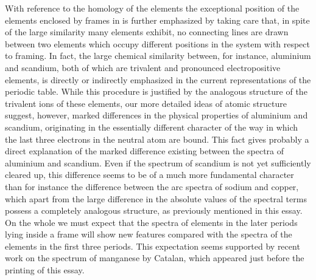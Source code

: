 With reference to the homology of the elements the exceptional
position of the elements enclosed by frames in  is further
emphasized by taking care that, in spite of the large similarity
many elements exhibit, no connecting lines are drawn between
two elements which occupy different positions in the system with
respect to framing. In fact, the large chemical similarity between,
for instance, aluminium and scandium, both of which are trivalent
and pronounced electropositive elements, is directly or indirectly
emphasized in the current representations of the periodic table.
While this procedure is justified by the analogous structure of the
trivalent ions of these elements, our more detailed ideas of atomic
structure suggest, however, marked differences in the physical
properties of aluminium and scandium, originating in the essentially
different character of the way in which the last three electrons
in the neutral atom are bound. This fact gives probably a direct
explanation of the marked difference existing between the spectra
of aluminium and scandium. Even if the spectrum of scandium is
not yet sufficiently cleared up, this difference seems to be of a much
more fundamental character than for instance the difference between
the arc spectra of sodium and copper, which apart from the large
difference in the absolute values of the spectral terms possess a
completely analogous structure, as previously mentioned in this
essay. On the whole we must expect that the spectra of elements
in the later periods lying inside a frame will show new features
compared with the spectra of the elements in the first three periods.
This expectation seems supported by recent work on the spectrum
of manganese by Catalan, which appeared just before the printing
of this essay.

